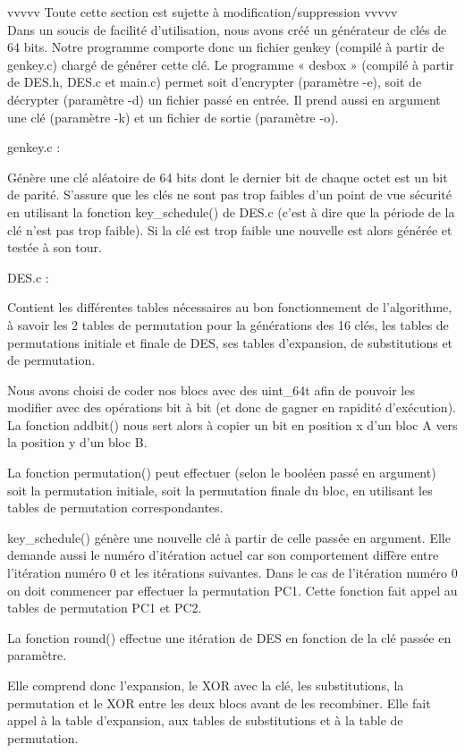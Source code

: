 \documentclass[a4paper,12pt]{article}
\begin{document}
vvvvv Toute cette section est sujette à modification/suppression vvvvv \\

Dans un soucis de facilité d'utilisation, nous avons créé un générateur de clés de 64 bits. Notre programme comporte donc un fichier genkey (compilé à partir de genkey.c) chargé de générer cette clé. Le programme « desbox » (compilé à partir de DES.h, DES.c et main.c) permet soit d'encrypter (paramètre -e), soit de décrypter (paramètre -d) un fichier passé en entrée. Il prend aussi en argument une clé (paramètre -k) et un fichier de sortie (paramètre -o).

genkey.c :

	Génère une clé aléatoire de 64 bits dont le dernier bit de chaque octet est un bit de parité. S'assure que les clés ne sont pas trop faibles d'un point de vue sécurité en utilisant la fonction key\_schedule() de DES.c (c'est à dire que la période de la clé n'est pas trop faible). Si la clé est trop faible une nouvelle est alors générée et testée à son tour.

DES.c :

	Contient les différentes tables nécessaires au bon fonctionnement de l'algorithme, à savoir les 2 tables de permutation pour la générations des 16 clés, les tables de permutations initiale et finale de DES, ses tables d'expansion, de substitutions et de permutation.
	
	Nous avons choisi de coder nos blocs avec des uint\_64t afin de pouvoir les modifier avec des opérations bit à bit (et donc de gagner en rapidité d'exécution). La fonction addbit() nous sert alors à copier un bit en position x d'un bloc A vers la position y d'un bloc B.
	
	La fonction permutation() peut effectuer (selon le booléen passé en argument) soit la permutation initiale, soit la permutation finale du bloc, en utilisant les tables de permutation correspondantes.
	
	key\_schedule() génère une nouvelle clé à partir de celle passée en argument. Elle demande aussi le numéro d'itération actuel car son comportement diffère entre l'itération numéro 0 et les itérations suivantes. Dans le cas de l'itération numéro 0 on doit commencer par effectuer la permutation PC1. Cette fonction fait appel au tables de permutation PC1 et PC2.
	
	La fonction round() effectue une itération de DES en fonction de la clé passée en paramètre.
	
Elle comprend donc l'expansion, le XOR avec la clé, les substitutions, la permutation et le XOR entre les deux blocs avant de les recombiner. Elle fait appel à la table d'expansion, aux tables de substitutions et à la table de permutation.
\end{document}
